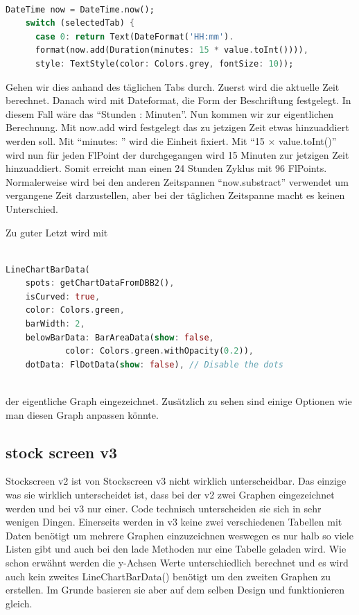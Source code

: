 \documentclass[11pt]{scrartcl}
\begin{document}
\begin{lstlisting}[language=Dart]

DateTime now = DateTime.now();
    switch (selectedTab) {
      case 0: return Text(DateFormat('HH:mm').
      format(now.add(Duration(minutes: 15 * value.toInt()))),
      style: TextStyle(color: Colors.grey, fontSize: 10));
\end{lstlisting}

Gehen wir dies anhand des täglichen Tabs durch. Zuerst wird die aktuelle Zeit berechnet. Danach wird mit Dateformat, die Form der Beschriftung festgelegt. In diesem Fall wäre das \enquote{Stunden : Minuten}. Nun kommen wir zur eigentlichen Berechnung. Mit now.add wird festgelegt das zu jetzigen Zeit etwas hinzuaddiert werden soll. Mit \enquote{minutes: } wird die Einheit fixiert. Mit \enquote{15 $\times$ value.toInt()} wird nun für jeden FlPoint der durchgegangen wird 15 Minuten zur jetzigen Zeit hinzuaddiert. Somit erreicht man einen 24 Stunden Zyklus mit 96 FlPoints. Normalerweise wird bei den anderen Zeitspannen \enquote{now.substract} verwendet um vergangene Zeit darzustellen, aber bei der täglichen Zeitspanne macht es keinen Unterschied.

Zu guter Letzt wird mit

\begin{lstlisting}[language=Dart]

LineChartBarData(
    spots: getChartDataFromDBB2(),
    isCurved: true,
    color: Colors.green,
    barWidth: 2,
    belowBarData: BarAreaData(show: false, 
            color: Colors.green.withOpacity(0.2)),
    dotData: FlDotData(show: false), // Disable the dots
                        
\end{lstlisting}

der eigentliche Graph eingezeichnet. Zusätzlich zu sehen sind einige Optionen wie man diesen Graph anpassen könnte.

\subsection*{stock screen v3}

Stockscreen v2 ist von Stockscreen v3 nicht wirklich unterscheidbar. Das einzige was sie wirklich unterscheidet ist, dass bei der v2 zwei Graphen eingezeichnet werden und bei v3 nur einer. Code technisch unterscheiden sie sich in sehr wenigen Dingen. Einerseits werden in v3 keine zwei verschiedenen Tabellen mit Daten benötigt um mehrere Graphen einzuzeichnen weswegen es nur halb so viele Listen gibt und auch bei den lade Methoden nur eine Tabelle geladen wird. Wie schon erwähnt werden die y-Achsen Werte unterschiedlich berechnet und es wird auch kein zweites LineChartBarData() benötigt um den zweiten Graphen zu erstellen. Im Grunde basieren sie aber auf dem selben Design und funktionieren gleich.
\end{document}

